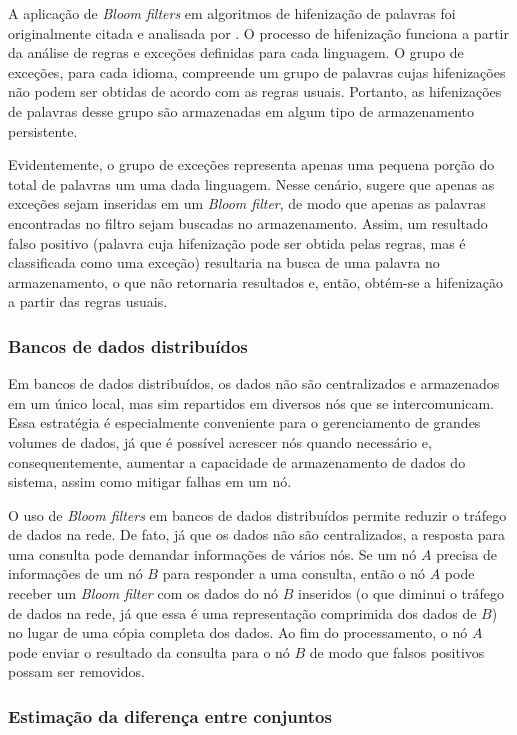 \documentclass[12pt,twoside,english,brazilian]{article}
\begin{document}
A aplicação de \textit{Bloom filters} em algoritmos de hifenização de palavras foi originalmente citada e analisada por \citet{bloom}. O processo de hifenização funciona a partir da análise de regras e exceções definidas para cada linguagem. O grupo de exceções, para cada idioma, compreende um grupo de palavras cujas hifenizações não podem ser obtidas de acordo com as regras usuais. Portanto, as hifenizações de palavras desse grupo são armazenadas em algum tipo de armazenamento persistente.

Evidentemente, o grupo de exceções representa apenas uma pequena porção do total de palavras um uma dada linguagem. Nesse cenário, \citet{bloom} sugere que apenas as exceções sejam inseridas em um \textit{Bloom filter}, de modo que apenas as palavras encontradas no filtro sejam buscadas no armazenamento. Assim, um resultado falso positivo (palavra cuja hifenização pode ser obtida pelas regras, mas é classificada como uma exceção) resultaria na busca de uma palavra no armazenamento, o que não retornaria resultados e, então, obtém-se a hifenização a partir das regras usuais. 

\subsubsection{Bancos de dados distribuídos}

Em bancos de dados distribuídos, os dados não são centralizados e armazenados em um único local, mas sim repartidos em diversos nós que se intercomunicam. Essa estratégia é especialmente conveniente para o gerenciamento de grandes volumes de dados, já que é possível acrescer nós quando necessário e, consequentemente, aumentar a capacidade de armazenamento de dados do sistema, assim como mitigar falhas em um nó.

O uso de \textit{Bloom filters} em bancos de dados distribuídos permite reduzir o tráfego de dados na rede. De fato, já que os dados não são centralizados, a resposta para uma consulta pode demandar informações de vários nós. Se um nó $A$ precisa de informações de um nó $B$ para responder a uma consulta, então o nó $A$ pode receber um \textit{Bloom filter} com os dados do nó $B$ inseridos (o que diminui o tráfego de dados na rede, já que essa é uma representação comprimida dos dados de $B$) no lugar de uma cópia completa dos dados. Ao fim do processamento, o nó $A$ pode enviar o resultado da consulta para o nó $B$ de modo que falsos positivos possam ser removidos.

\subsubsection{Estimação da diferença entre conjuntos}
\end{document}
